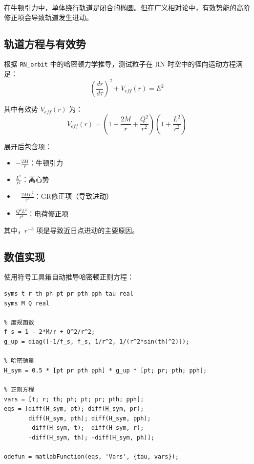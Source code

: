 \documentclass[a4paper,12pt]{article}
\begin{document}
在牛顿引力中，单体绕行轨道是闭合的椭圆。但在广义相对论中，有效势能的高阶修正项会导致轨道发生进动。

\subsection{轨道方程与有效势}

根据 \texttt{RN\_orbit} 中的哈密顿力学推导，测试粒子在 RN 时空中的径向运动方程满足：
\begin{equation}
    \left(\frac{dr}{d\tau}\right)^2 + V_{eff}(r) = E^2
\end{equation}

其中有效势 $V_{eff}(r)$ 为：
\begin{equation}
    V_{eff}(r) = \left(1 - \frac{2M}{r} + \frac{Q^2}{r^2}\right)\left(1 + \frac{L^2}{r^2}\right)
\end{equation}

展开后包含项：
\begin{itemize}
    \item $-\frac{2M}{r}$：牛顿引力
    \item $\frac{L^2}{r^2}$：离心势
    \item $-\frac{2ML^2}{r^3}$：GR修正项（导致进动）
    \item $\frac{Q^2L^2}{r^4}$：电荷修正项
\end{itemize}

其中，$r^{-3}$ 项是导致近日点进动的主要原因。

\subsection{数值实现}

使用符号工具箱自动推导哈密顿正则方程：

\begin{lstlisting}[caption={哈密顿方程符号推导}]
% 定义符号变量
syms t r th ph pt pr pth pph tau real
syms M Q real

% 度规函数
f_s = 1 - 2*M/r + Q^2/r^2;
g_up = diag([-1/f_s, f_s, 1/r^2, 1/(r^2*sin(th)^2)]);

% 哈密顿量
H_sym = 0.5 * [pt pr pth pph] * g_up * [pt; pr; pth; pph];

% 正则方程
vars = [t; r; th; ph; pt; pr; pth; pph];
eqs = [diff(H_sym, pt); diff(H_sym, pr); 
       diff(H_sym, pth); diff(H_sym, pph);
       -diff(H_sym, t); -diff(H_sym, r); 
       -diff(H_sym, th); -diff(H_sym, ph)];

odefun = matlabFunction(eqs, 'Vars', {tau, vars});
\end{lstlisting}
\end{document}
